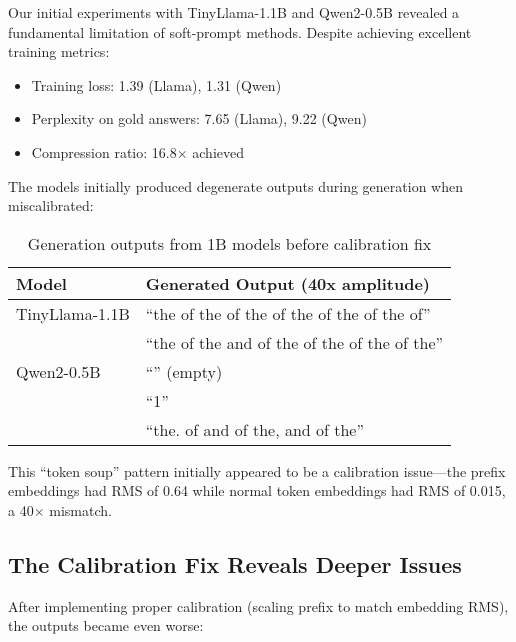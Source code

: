 \documentclass{article}
\begin{document}
Our initial experiments with TinyLlama-1.1B and Qwen2-0.5B revealed a fundamental limitation of soft-prompt methods. Despite achieving excellent training metrics:
\begin{itemize}
\item Training loss: 1.39 (Llama), 1.31 (Qwen)
\item Perplexity on gold answers: 7.65 (Llama), 9.22 (Qwen)
\item Compression ratio: 16.8$\times$ achieved
\end{itemize}

The models initially produced degenerate outputs during generation when miscalibrated:

\begin{table}[h]
\caption{Generation outputs from 1B models before calibration fix}
\label{tab:degenerate_before}
\vskip 0.15in
\begin{center}
\begin{small}
\begin{tabular}{ll}
\toprule
Model & Generated Output (40x amplitude) \\
\midrule
TinyLlama-1.1B & ``the of the of the of the of the of the of'' \\
 & ``the of the and of the of the of the of the'' \\
Qwen2-0.5B & ``'' (empty) \\
 & ``1'' \\
 & ``the. of and of the, and of the'' \\
\bottomrule
\end{tabular}
\end{small}
\end{center}
\vskip -0.1in
\end{table}

This ``token soup'' pattern initially appeared to be a calibration issue—the prefix embeddings had RMS of 0.64 while normal token embeddings had RMS of 0.015, a 40$\times$ mismatch.

\subsection{The Calibration Fix Reveals Deeper Issues}

After implementing proper calibration (scaling prefix to match embedding RMS), the outputs became even worse:
\end{document}
